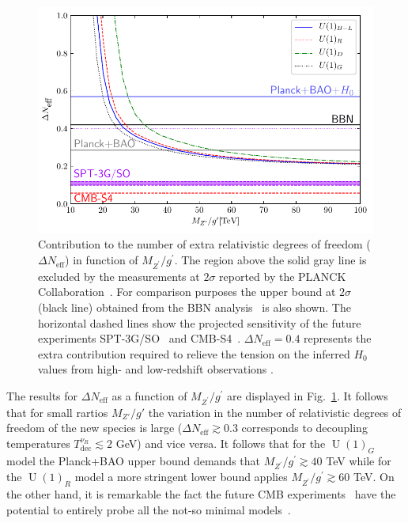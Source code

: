 \documentclass[12pt]{article}
\begin{document}
%
\begin{figure}[t]
\centering
\includegraphics[scale=1]{D_Neff.pdf}
\caption{Contribution to the number of extra relativistic degrees of freedom ($\Delta N_{\text{eff}}$) in function of $M_{Z^{\prime}}/g^{\prime}$. The region above the solid gray line is excluded by the measurements at $2\sigma$ reported by the PLANCK Collaboration~\cite{Aghanim:2018eyx}. For comparison purposes  the upper bound at $2\sigma$ (black line) obtained from the BBN analysis~\cite{Pitrou:2018cgg} is also shown.  The horizontal dashed lines show the projected sensitivity of the future experiments SPT-3G/SO~\cite{Benson:2014qhw} and CMB-S4~\cite{Abitbol:2019nhf}. $\Delta N_{\text{eff}}=0.4$ represents the extra contribution  required to relieve the tension on the inferred $H_0$ values from  high- and low-redshift observations \cite{Bernal:2016gxb,Mortsell:2018mfj}. }
\label{fig:Neff}
\end{figure}
%

The results for $\Delta N_{\text{eff}}$ as a function of $M_{Z^{\prime}}/g^{\prime}$ are displayed in Fig.~\ref{fig:Neff}. It follows that for small rartios $M_{Z'}/g'$  the variation in the number of relativistic degrees of freedom of the new species is large ($\Delta N_{\text{eff}}\gtrsim0.3$ corresponds to decoupling temperatures $T^{\nu_R}_{\text{dec}}\lesssim2$ GeV) and vice versa.
It follows that for the $\operatorname{U}(1)_{G}$ model the Planck+BAO upper bound demands that $M_{Z^{\prime}}/g^{\prime} \gtrsim 40$ TeV while for the $\operatorname{U}(1)_{R}$ model a more stringent lower bound applies $M_{Z^{\prime}}/g^{\prime} \gtrsim 60$ TeV. 
On the other hand, it is remarkable the fact the future CMB experiments~\cite{Benson:2014qhw,Abitbol:2019nhf} have the potential to entirely probe all the not-so minimal models~\cite{Abazajian:2019oqj}.  
\end{document}
